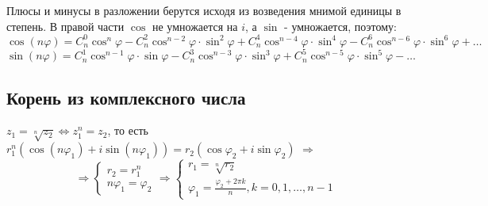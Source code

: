 \documentclass[class=article,a4paper,12pt,crop=false]{standalone}
\begin{document}
Плюсы и минусы в разложении берутся исходя из возведения мнимой единицы в степень. В правой части
$\cos$ не умножается на $i$, а $\sin$ - умножается, поэтому:
\begin{equation}
    \cos{(n\varphi)} = C_n^0\cos^n\varphi - C_n^2\cos^{n-2}\varphi\cdot{\sin^2{\varphi}} +
    C_n^4\cos^{n-4}\varphi\cdot{\sin^4\varphi}
    - C_n^6\cos^{n-6}\varphi\cdot{\sin^6{\varphi}} + \dots
\end{equation}
\begin{equation}
    \sin{(n\varphi)} = C_n^1\cos^{n-1}\varphi\cdot\sin{\varphi} -
    C_n^3\cos^{n-3}\varphi\cdot{\sin^3{\varphi}} + C_n^5\cos^{n-5}\varphi\cdot{\sin^5{\varphi}} -
    \dots
\end{equation}

\subsection{Корень из комплексного числа}

$z_1 = \sqrt[n]{z_2} \Leftrightarrow z_1^n = z_2$, то есть
$r_1^n(\cos{(n\varphi_1)} + i\sin{(n\varphi_1)}) = r_2(\cos{\varphi_2} + i\sin{\varphi_2})$ $\Rightarrow$
\begin{equation}
\Rightarrow \begin{cases}
    r_2 = r_1^n \\
    n\varphi_1 = \varphi_2
\end{cases} \Rightarrow
\begin{cases}
    r_1 = \sqrt[n]{r_2}\\
    \varphi_1 = \frac{\varphi_2 + 2\pi{k}}{n}, k = 0, 1, \dots, n-1
\end{cases}
\end{equation}
\end{document}
